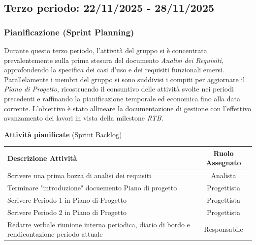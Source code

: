\documentclass[a4paper, 11pt, oneside]{scrartcl} %
\begin{document}

\subsection{Terzo periodo: 22/11/2025 - 28/11/2025}

\subsubsection*{Pianificazione (Sprint Planning)}

Durante questo terzo periodo, l'attività del gruppo si è concentrata prevalentemente sulla prima stesura del documento \textit{Analisi dei Requisiti}, approfondendo la specifica dei casi d'uso e dei requisiti funzionali emersi. \\Parallelamente i membri del gruppo si sono suddivisi i compiti per aggiornare il \textit{Piano di Progetto}, ricostruendo il consuntivo delle attività svolte nei periodi precedenti e raffinando la pianificazione temporale ed economica fino alla data corrente. L'obiettivo è stato allineare la documentazione di gestione con l'effettivo avanzamento dei lavori in vista della milestone \textit{RTB}.

\begin{table}[!ht]
\vspace{0.2cm}
\centering
{\large \textbf{Attività pianificate} (Sprint Backlog)} \\
\vspace{0.3cm}
\renewcommand{\arraystretch}{1.4}
\begin{tabularx}{\textwidth}{|X|c|} 
\hline
\rowcolor{white} 
\textbf{Descrizione Attività} & \textbf{Ruolo Assegnato} \\
\hline
Scrivere una prima bozza di analisi dei requisiti & Analista \\
Terminare "introduzione" docuemento Piano di progetto & Progettista \\
Scrivere Periodo 1 in Piano di Progetto & Progettista \\
Scrivere Periodo 2 in Piano di Progetto & Progettista \\ 
Redarre verbale riunione interna periodica, diario di bordo e rendicontazione periodo attuale & Responsabile \\
\hline
\end{tabularx}
\end{table}
\FloatBarrier
\end{document}
